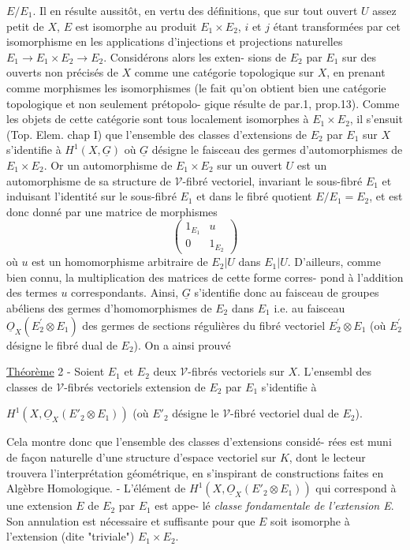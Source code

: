 $E/E_1$. Il en résulte aussitôt, en vertu des définitions, que sur tout
ouvert $U$ assez petit de $X$, $E$ est isomorphe au produit $E_1 \times E_2$, $i$ et $j$
étant transformées par cet isomorphisme en les applications d'injections
et projections naturelles $E_1 \rightarrow E_1 \times E_2 \rightarrow E_2$. Considérons alors les exten-
sions de $E_2$ par $E_1$ sur des ouverts non précisés de $X$ comme une catégorie
topologique sur $X$, en prenant comme morphismes les isomorphismes (le fait
qu'on obtient bien une catégorie topologique et non seulement prétopolo-
gique résulte de par.1, prop.13). Comme les objets de cette catégorie
sont tous localement isomorphes à $E_1 \times E_2$, il s'ensuit (Top. Elem. chap I)
que l'ensemble des classes d'extensions de $E_2$ par $E_1$ sur $X$ s'identifie
à $H^1(X,\underline{G})$ où $\underline{G}$ désigne le faisceau des germes d'automorphismes de $E_1 \times E_2$.
Or un automorphisme de $E_1 \times E_2$ sur un ouvert $U$ est un automorphisme de sa
structure de $\mathcal{V}$-fibré vectoriel, invariant le sous-fibré $E_1$ et induisant
l'identité sur le sous-fibré $E_1$ et dans le fibré quotient $E/E_1 = E_2$, et
est donc donné par une matrice de morphismes
$$
\begin{pmatrix}
1_{E_1} & u \\
0 & 1_{E_2}
\end{pmatrix}
$$
où $u$ est un homomorphisme arbitraire de $E_2|U$ dans $E_1|U$. D'ailleurs,
comme bien connu, la multiplication des matrices de cette forme corres-
pond à l'addition des termes $u$ correspondants. Ainsi, $\underline{G}$ s'identifie donc
au faisceau de groupes abéliens des germes d'homomorphismes de $E_2$ dans $E_1$
i.e. au faisceau $\underline{O}_X(E^\prime_2 \otimes E_1)$ des germes de sections régulières du fibré
vectoriel $E^\prime_2 \otimes E_1$ (où $E^\prime_2$ désigne le fibré dual de $E_2$). On a ainsi prouvé

\underline{Théorème} 2 - Soient $E_1$ et $E_2$ deux $\mathcal{V}$-fibrés vectoriels sur $X$. L'ensembl
des classes de $\mathcal{V}$-fibrés vectoriels extension de $E_2$ par $E_1$ s'identifie à

\newpage



$H^1(X,\underline{O}_X(E'_2 \otimes E_1))$ (où $E'_2$ désigne le $\mathcal{V}$-fibré vectoriel dual de $E_2$).

Cela montre donc que l'ensemble des classes d'extensions considé-
rées est muni de façon naturelle d'une structure d'espace vectoriel sur
$K$, dont le lecteur trouvera l'interprétation géométrique, en s'inspirant
de constructions faites en Algèbre Homologique. - L'élément de
$H^1(X,\underline{O}_X(E'_2 \otimes E_1))$ qui correspond à une extension $E$ de $E_2$ par $E_1$ est appe-
lé \emph{classe fondamentale de l'extension E}. Son annulation est nécessaire
et suffisante pour que $E$ soit isomorphe à l'extension (dite "triviale")
$E_1 \times E_2$.

